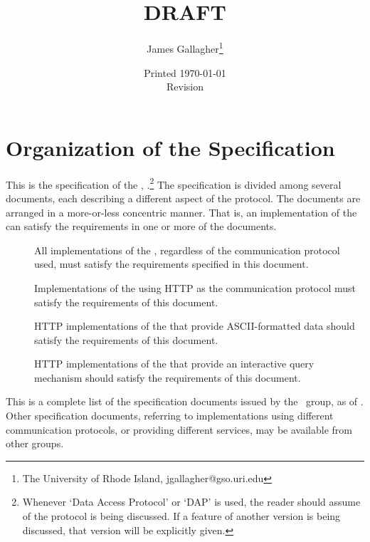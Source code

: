 \documentclass[justify]{dods-paper}
\title{\DAPOverviewTitle\\ DRAFT}
\author{James Gallagher\thanks{The University of Rhode Island,
    jgallagher@gso.uri.edu}}
\date{Printed \today \\ Revision \rcsInfoRevision}
\begin{document}
\maketitle
\T\tableofcontents

\section{Organization of the Specification}

This is the specification of the \DAP, \dapversion.\footnote{Whenever
  `Data Access Protocol' or `DAP' is used, the reader should assume
  \dapversion of the protocol is being discussed. If a feature of
  another version is being discussed, that version will be explicitly
  given.}  The specification is divided among several documents, each
describing a different aspect of the protocol.  The documents are
arranged in a more-or-less concentric manner.  That is, an
implementation of the \DAP can satisfy the requirements in one or more
of the documents.

\begin{description}

\item[\DAPObjects] All implementations of the \DAP, regardless of the
  communication protocol used, must satisfy the requirements specified
  in this document.

\item[\DAPHTTP]  Implementations of the \DAP using HTTP as the
  communication protocol must satisfy the requirements of this
  document. 

\item[\DAPASCII] HTTP implementations of the \DAP that provide
  ASCII-formatted data should satisfy the requirements of this
  document.

\item[\DAPHTML] HTTP implementations of the \DAP that provide
  an interactive query mechanism should satisfy the requirements of
  this document.


\end{description}

This is a complete list of the specification documents issued by the
\opendap\ group, as of \rcsdocumentdate.  Other specification documents,
referring to implementations using different communication protocols,
or providing different services, may be available from other groups.
\end{document}

